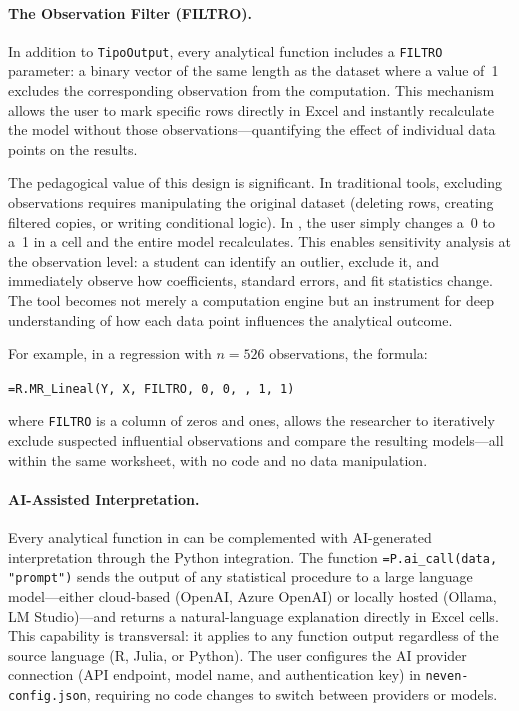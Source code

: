 \paragraph{The Observation Filter (FILTRO).}
In addition to \texttt{TipoOutput}, every analytical function includes a \texttt{FILTRO} parameter: a binary vector of the same length as the dataset where a value of~1 excludes the corresponding observation from the computation. This mechanism allows the user to mark specific rows directly in Excel and instantly recalculate the model without those observations---quantifying the effect of individual data points on the results.

The pedagogical value of this design is significant. In traditional tools, excluding observations requires manipulating the original dataset (deleting rows, creating filtered copies, or writing conditional logic). In \neven{}, the user simply changes a~0 to a~1 in a cell and the entire model recalculates. This enables sensitivity analysis at the observation level: a student can identify an outlier, exclude it, and immediately observe how coefficients, standard errors, and fit statistics change. The tool becomes not merely a computation engine but an instrument for deep understanding of how each data point influences the analytical outcome.

For example, in a regression with $n = 526$ observations, the formula:
\begin{center}
\texttt{=R.MR\_Lineal(Y, X, FILTRO, 0, 0, , 1, 1)}
\end{center}
where \texttt{FILTRO} is a column of zeros and ones, allows the researcher to iteratively exclude suspected influential observations and compare the resulting models---all within the same worksheet, with no code and no data manipulation.

\paragraph{AI-Assisted Interpretation.}
Every analytical function in \neven{} can be complemented with AI-generated interpretation through the Python integration. The function \texttt{=P.ai\_call(data, "prompt")} sends the output of any statistical procedure to a large language model---either cloud-based (OpenAI, Azure OpenAI) or locally hosted (Ollama, LM Studio)---and returns a natural-language explanation directly in Excel cells. This capability is transversal: it applies to any function output regardless of the source language (R, Julia, or Python). The user configures the AI provider connection (API endpoint, model name, and authentication key) in \texttt{neven-config.json}, requiring no code changes to switch between providers or models.


